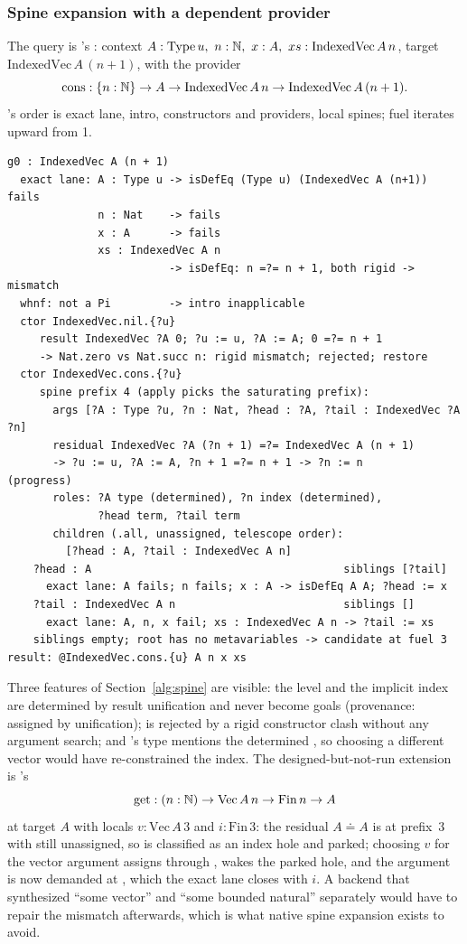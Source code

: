 \subsubsection{Spine expansion with a dependent provider}

The query is 's : context $A : \mathrm{Type}\,u,\ n : \mathbb{N},\ x : A,\ xs : \mathrm{IndexedVec}\,A\,n$, target $\mathrm{IndexedVec}\,A\,(n+1)$, with the provider
\[
 \mathrm{cons} : \{n : \mathbb{N}\} \to A \to \mathrm{IndexedVec}\,A\,n \to \mathrm{IndexedVec}\,A\,(n+1).
\]
's order is exact lane, intro, constructors and providers, local spines; fuel iterates upward from 1.

\begin{lstlisting}
g0 : IndexedVec A (n + 1)
  exact lane: A : Type u -> isDefEq (Type u) (IndexedVec A (n+1)) fails
              n : Nat    -> fails
              x : A      -> fails
              xs : IndexedVec A n
                         -> isDefEq: n =?= n + 1, both rigid -> mismatch
  whnf: not a Pi         -> intro inapplicable
  ctor IndexedVec.nil.{?u}
     result IndexedVec ?A 0; ?u := u, ?A := A; 0 =?= n + 1
     -> Nat.zero vs Nat.succ n: rigid mismatch; rejected; restore
  ctor IndexedVec.cons.{?u}
     spine prefix 4 (apply picks the saturating prefix):
       args [?A : Type ?u, ?n : Nat, ?head : ?A, ?tail : IndexedVec ?A ?n]
       residual IndexedVec ?A (?n + 1) =?= IndexedVec A (n + 1)
       -> ?u := u, ?A := A, ?n + 1 =?= n + 1 -> ?n := n        (progress)
       roles: ?A type (determined), ?n index (determined),
              ?head term, ?tail term
       children (.all, unassigned, telescope order):
         [?head : A, ?tail : IndexedVec A n]
    ?head : A                                       siblings [?tail]
      exact lane: A fails; n fails; x : A -> isDefEq A A; ?head := x
    ?tail : IndexedVec A n                          siblings []
      exact lane: A, n, x fail; xs : IndexedVec A n -> ?tail := xs
    siblings empty; root has no metavariables -> candidate at fuel 3
result: @IndexedVec.cons.{u} A n x xs
\end{lstlisting}

Three features of Section~\ref{alg:spine} are visible: the level  and the implicit index  are determined by result unification and never become goals (provenance: assigned by unification);  is rejected by a rigid constructor clash without any argument search; and 's type mentions the determined , so choosing a different vector would have re-constrained the index. The designed-but-not-run extension is 's
\[
 \mathrm{get} : (n : \mathbb{N}) \to \mathrm{Vec}\,A\,n \to \mathrm{Fin}\,n \to A
\]
at target $A$ with locals $v : \mathrm{Vec}\,A\,3$ and $i : \mathrm{Fin}\,3$: the residual $A \doteq A$ is  at prefix~3 with  still unassigned, so  is classified as an index hole and parked; choosing $v$ for the vector argument assigns  through ,  wakes the parked hole, and the  argument is now demanded at , which the exact lane closes with $i$. A backend that synthesized ``some vector'' and ``some bounded natural'' separately would have to repair the mismatch afterwards, which is what native spine expansion exists to avoid.
